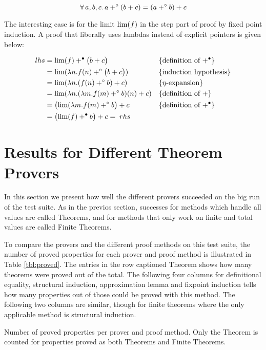 \begin{equation*}
\forall \, a , b , c . \, a +^{\circ} (b + c) = (a +^{\circ} b) + c
\end{equation*}

\noindent
The interesting case is for the limit $\mathrm{lim}(f)$ in the step part of
proof by fixed point induction. A proof that liberally uses
lambdas instead of explicit pointers is given below:

\begin{align*}
lhs = & \; \mathrm{lim} (f) +^{\bullet} \big(b + c\big)                               && \{\textrm{definition of $+^{\bullet}$}\}\\
    = & \; \mathrm{lim} (\lambda n . f(n) +^{\circ} \big(b + c\big))                && \{\textrm{induction hypothesis}\}\\
    = & \; \mathrm{lim} (\lambda n . (f(n) +^{\circ} b) + c)                && \{\textrm{$\eta$-expansion}\}\\
    = & \; \mathrm{lim} (\lambda n . (\lambda m . f(m) +^{\circ} b)(n) + c) && \{\textrm{definition of $+$}\}\\
    = & \; \big(\mathrm{lim} (\lambda m . f(m) +^{\circ} b\big) + c                 && \{\textrm{definition of $+^{\bullet}$}\}\\
    = & \; \big(\mathrm{lim} (f) +^{\bullet} b\big) + c = \; rhs
\end{align*}



\section{Results for Different Theorem Provers}

In this section we present how well the different provers succeeded on
the big run of the test suite. As in the previos section, successes for
methods which handle all values are called Theorems, and for methods
that only work on finite and total values are called Finite Theorems.

To compare the provers and the different proof methods on this test
suite, the number of proved properties for each prover and proof
method is illustrated in Table \ref{tbl:proved}. The entries in the
row captioned Theorem shows how many theorems were proved out of the
total. The following four columns for definitional equality,
structural induction, approximation lemma and fixpoint induction tells
how many properties out of those could be proved with this method. The
following two columns are similar, though for finite theorems where the
only applicable method is structural induction.

\begin{table}[h]
\centering

\caption{Number of proved properties per prover and proof method.
         Only the Theorem is counted for properties proved as both
         Theorems and Finite Theorems.
\label{tbl:proved}
}
\end{table}

